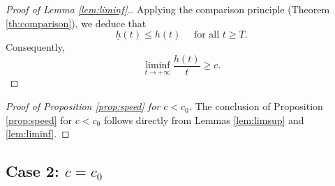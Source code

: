 \documentclass[reqno]{amsart}
\newcommand{\rev}[1]{#1}
\theoremstyle{plain}
\theoremstyle{definition}
\theoremstyle{remark}
\begin{document}
\begin{proof}[Proof of Lemma \ref{lem:liminf}.]
		Applying the comparison principle (Theorem \ref{th:comparison}), we deduce that
		\[
		\rev{\underline{h}(t) \le h(t) \quad\text{ for all } t \ge T.}
		\]
		Consequently,
		\[
		\liminf_{t \to +\infty}{\frac{h(t)}{t}} \ge c.
		\]		
	\end{proof}	
	
	\begin{proof}[Proof of Proposition \ref{prop:speed} for $c < c_0$]
		The conclusion of Proposition \ref{prop:speed} for $c < c_0$ follows directly from Lemmas \ref{lem:limsup} and \ref{lem:liminf}.
	\end{proof}	
	
	\subsection{Case 2: $c = c_0$}
	
\end{document}
